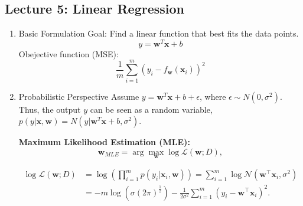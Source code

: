\documentclass[
]{ctexart}
\begin{document}
\subsection{Lecture 5: Linear
Regression}\label{lecture-5-linear-regression}

\begin{enumerate}
\def\labelenumi{\arabic{enumi}.}
\item
  Basic Formulation Goal: Find a linear function that best fits the data
  points. \[y = \mathbf{w}^T \mathbf{x} + b\] Obejective function (MSE):
  \[\frac{1}{m} \sum_{i=1}^{m} (y_i - f_\mathbf{w}(\mathbf{x}_i))^2\]
\item
  Probabilistic Perspective Assume
  \(y = \mathbf{w}^T \mathbf{x} + b + \epsilon\), where
  \(\epsilon \sim N(0, \sigma^2)\). Thus, the output \(y\) can be seen
  as a random variable,
  \(p(y|\mathbf{x}, \mathbf{w}) = N(y|\mathbf{w}^T \mathbf{x} + b, \sigma^2)\).

  \textbf{Maximum Likelihood Estimation (MLE):}
  \[\mathbf{w}_{MLE} = \arg \max_{\mathbf{w}} \log \mathcal{L}(\mathbf{w}; D),\]

  \begin{align*}
   \log \mathcal{L}(\mathbf{w}; D) &= \log \left( \prod_{i=1}^{m} p(y_i|\mathbf{x}_i, \mathbf{w}) \right) = \sum_{i=1}^{m} \log \mathcal{N}(\mathbf{w}^\top \mathbf{x}_i, \sigma^2) \\
   &= -m \log(\sigma(2\pi)^{\frac{1}{2}}) - \frac{1}{2\sigma^2} \sum_{i=1}^{m} (y_i - \mathbf{w}^\top \mathbf{x}_i)^2.
\end{align*}


\end{enumerate}
\end{document}
